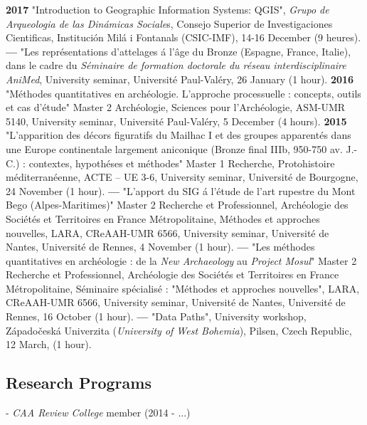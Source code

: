 \documentclass[11pt]{report} %
\begin{document}
\textbf{2017 }"Introduction to Geographic Information Systems: QGIS", \textit{Grupo de Arqueologia de las Din\'{a}micas Sociale}s, Consejo Superior de Investigaciones Cientificas, Instituci\'{o}n Mil\'{a} i Fontanals (CSIC-IMF), 14-16 December (9 heures).\textbf{}
\smallbreak
\textbf{---  }"Les repr\'{e}sentations d'attelages \'{a} l'\^{a}ge du Bronze (Espagne, France, Italie), dans le cadre du \textit{S\'{e}minaire de formation doctorale du r\'{e}seau interdisciplinaire AniMed}, University seminar, Universit\'{e} Paul-Val\'{e}ry, 26 January (1 hour).
\smallbreak
\textbf{2016 }"M\'{e}thodes quantitatives en arch\'{e}ologie. L'approche processuelle : concepts, outils et cas d'\'{e}tude" Master 2 Arch\'{e}ologie, Sciences pour l'Arch\'{e}ologie, ASM-UMR 5140, University seminar, Universit\'{e} Paul-Val\'{e}ry, 5 December (4 hours).
\smallbreak
\textbf{2015 }"L'apparition des d\'{e}cors figuratifs du Mailhac I et des groupes apparent\'{e}s dans une Europe continentale largement aniconique (Bronze final IIIb, 950-750 av. J.-C.) : contextes, hypoth\'{e}ses et m\'{e}thodes" Master 1 Recherche, Protohistoire m\'{e}diterran\'{e}enne, ACTE -- UE 3-6, University seminar, Universit\'{e} de Bourgogne, 24 November (1 hour).
\smallbreak
\textbf{---  }"L'apport du SIG \'{a} l'\'{e}tude de l'art rupestre du Mont Bego (Alpes-Maritimes)" Master 2 Recherche et Professionnel, Arch\'{e}ologie des Soci\'{e}t\'{e}s et Territoires en France M\'{e}tropolitaine, M\'{e}thodes et approches nouvelles, LARA, CReAAH-UMR 6566, University seminar, Universit\'{e} de Nantes, Universit\'{e} de Rennes, 4 November (1 hour).
\smallbreak
\textbf{---  }"Les m\'{e}thodes quantitatives en arch\'{e}ologie : de la \textit{New Archaeology} au \textit{Project Mosul}" Master 2 Recherche et Professionnel, Arch\'{e}ologie des Soci\'{e}t\'{e}s et Territoires en France M\'{e}tropolitaine, S\'{e}minaire sp\'{e}cialis\'{e} : "M\'{e}thodes et approches nouvelles", LARA, CReAAH-UMR 6566, University seminar, Universit\'{e} de Nantes, Universit\'{e} de Rennes, 16 October (1 hour).
\smallbreak
\textbf{---  }"Data Paths", University workshop, Z\'{a}pado\v{c}esk\'{a} Univerzita (\textit{University of West Bohemia}), Pilsen, Czech Republic, 12 March, (1 hour).

\subsection*{Research Programs}

-  \textit{CAA Review College} member (2014 - ...)
\end{document}
